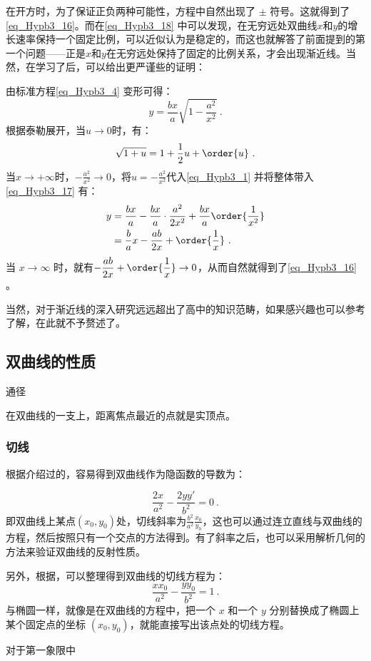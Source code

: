 在开方时，为了保证正负两种可能性，方程中自然出现了 $\pm$ 符号。这就得到了\autoref{eq_Hypb3_16}。而在\autoref{eq_Hypb3_18} 中可以发现，在无穷远处双曲线$x$和$y$的增长速率保持一个固定比例，可以近似认为是稳定的，而这也就解答了前面提到的第一个问题——正是$x$和$y$在无穷远处保持了固定的比例关系，才会出现渐近线。当然，在学习了后，可以给出更严谨些的证明：

由标准方程\autoref{eq_Hypb3_4} 变形可得：
\begin{equation}\label{eq_Hypb3_17}
y = \frac{bx}{a} \sqrt{1-\frac{a^2}{x^2}}~.
\end{equation}
根据泰勒展开，当$u\to 0$时，有：
\begin{equation}\label{eq_Hypb3_1}
\sqrt{1+u} = 1+\frac{1}{2}u+\order{u}~.
\end{equation}
当$x\to+\infty$时，$-\displaystyle\frac{a^2}{x^2}\to0$，将$\displaystyle u=-\frac{a^2}{x^2}$代入\autoref{eq_Hypb3_1} 并将整体带入\autoref{eq_Hypb3_17} 有：
\begin{equation}\label{eq_Hypb3_13}
\begin{split}
y &= \frac{bx}{a} -\frac{bx}{a} \cdot\frac{a^2}{2x^2}+\frac{bx}{a}\order{\frac{1}{x^2}}\\
& = \frac ba x - \frac{ab}{2x} + \order{\frac{1}{x}}~.
\end{split}
\end{equation}
当 $x\to\infty$ 时，就有$\displaystyle- \frac{ab}{2x} + \order{\frac{1}{x}}\to0$，从而自然就得到了\autoref{eq_Hypb3_16} 。

当然，对于渐近线的深入研究远远超出了高中的知识范畴，如果感兴趣也可以参考了解，在此就不予赘述了。

\subsection{双曲线的性质}

通径

在双曲线的一支上，距离焦点最近的点就是实顶点。

\subsubsection{切线}

根据介绍过的，容易得到双曲线作为隐函数的导数为：

\begin{equation}
\frac{2x}{a^2} - \frac{2yy'}{b^2} = 0~.
\end{equation}
即双曲线上某点$(x_0,y_0)$处，切线斜率为$\displaystyle\frac{b^2}{a^2}\frac{x_0}{y_0}$，这也可以通过连立直线与双曲线的方程，然后按照只有一个交点的方法得到。有了斜率之后，也可以采用解析几何的方法来验证双曲线的反射性质。

另外，根据，可以整理得到双曲线的切线方程为：
\begin{equation}
\frac{xx_0}{a^2} - \frac{yy_0}{b^2} = 1~.
\end{equation}
与椭圆一样，就像是在双曲线的方程中，把一个 $x$ 和一个 $y$ 分别替换成了椭圆上某个固定点的坐标 $(x_0, y_0)$，就能直接写出该点处的切线方程。

对于第一象限中